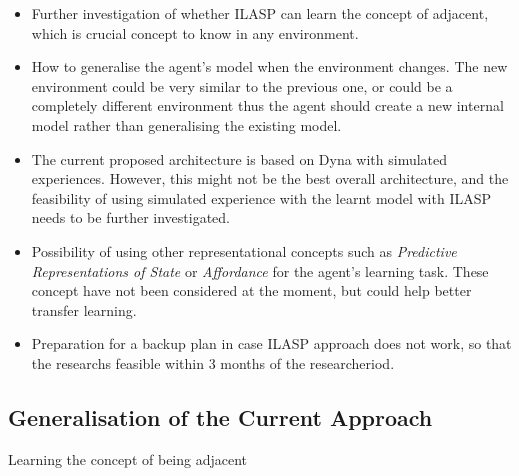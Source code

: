 \begin{itemize}

\item Further investigation of whether ILASP can learn the concept of adjacent, which is crucial concept to know in any environment.
\item How to generalise the agent's model when the environment changes. The new environment could be very similar to the previous one, or could be a completely different environment thus the agent should create a new internal model rather than generalising the existing model.
\item The current proposed architecture is based on Dyna with simulated experiences. However, this might not be the best overall architecture, and the feasibility of using simulated experience with the learnt model with ILASP needs to be further investigated.

\item Possibility of using other representational concepts such as \textit{Predictive Representations of State} or \textit{Affordance} \cite{Sridharan2017} for the agent's learning task. These concept have not been considered at the moment, but could help better transfer learning.

\item Preparation for a backup plan in case ILASP approach does not work, so that the researchs feasible within 3 months of the researcheriod.

\end{itemize}

\subsection{Generalisation of the Current Approach}

Learning the concept of being adjacent